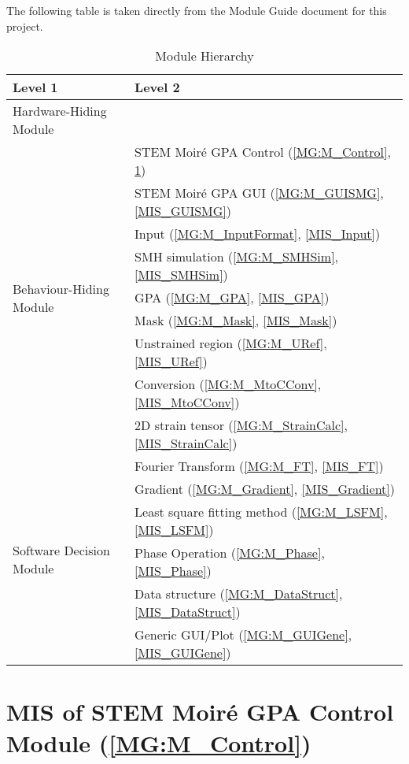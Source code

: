 \documentclass[12pt, titlepage]{article}
\newcommand{\progname}{STEM Moir{\'e} GPA}
\begin{document}
The following table is taken directly from the Module Guide document for this 
project.

\begin{table}[H]
\centering
\begin{tabular}{p{} p{}}
\toprule
\textbf{Level 1} & \textbf{Level 2}\\
\midrule

{Hardware-Hiding Module} & ~ \\
\midrule

\multirow{9}{0.3\textwidth}{Behaviour-Hiding Module} 
& \progname{} Control (\cref{MG:M_Control}, \cref{MIS_Control})\\
& \progname{} GUI (\cref{MG:M_GUISMG}, \cref{MIS_GUISMG})\\
& Input (\cref{MG:M_InputFormat}, \cref{MIS_Input})\\
& SMH simulation (\cref{MG:M_SMHSim}, \cref{MIS_SMHSim})\\
& GPA (\cref{MG:M_GPA}, \cref{MIS_GPA})\\
& Mask (\cref{MG:M_Mask}, \cref{MIS_Mask})\\
& Unstrained region (\cref{MG:M_URef}, \cref{MIS_URef})\\
& Conversion (\cref{MG:M_MtoCConv}, \cref{MIS_MtoCConv})\\
& 2D strain tensor (\cref{MG:M_StrainCalc}, \cref{MIS_StrainCalc})\\
\midrule

\multirow{6}{0.3\textwidth}{Software Decision Module} & Fourier Transform 
(\cref{MG:M_FT}, \cref{MIS_FT}) \\
& Gradient (\cref{MG:M_Gradient}, \cref{MIS_Gradient}) \\
& Least square fitting method (\cref{MG:M_LSFM}, \cref{MIS_LSFM})  \\
& Phase Operation (\cref{MG:M_Phase}, \cref{MIS_Phase}) \\
& Data structure (\cref{MG:M_DataStruct}, \cref{MIS_DataStruct}) \\
& Generic GUI/Plot (\cref{MG:M_GUIGene}, \cref{MIS_GUIGene}) \\
\bottomrule

\end{tabular}
\caption{Module Hierarchy}
\label{TblMH}
\end{table}

\newpage


\section{MIS of STEM Moir{\'e} GPA Control Module 
(\texorpdfstring{\cref{MG:M_Control}}))} \label{MIS_Control}
\end{document}
